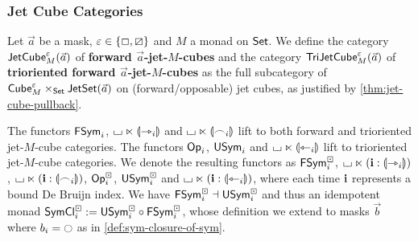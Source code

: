 \documentclass[a4paper]{memoir}
\begin{document}
\subsubsection{Jet Cube Categories}
\begin{definition} \label{def:jet-cube-cat}
	Let $\vec a$ be a mask, $\varepsilon \in \mathopen{}\left\{ \Box, \boxslash \right\}\mathclose{}$ and $M$ a monad on ${\mathsf{Set}}$.
	We define
	the category $\mathsf{JetCube}^{\varepsilon}_{M}\mathopen{}\left( \vec a \right)\mathclose{}$ of \textbf{forward $\vec a$-jet-$M$-cubes} and
	the category $\mathsf{TriJetCube}^{\varepsilon}_{M}\mathopen{}\left( \vec a \right)\mathclose{}$ of \textbf{trioriented forward $\vec a$-jet-$M$-cubes}
	as the full subcategory of ${\mathsf{Cube}}^\varepsilon_M \times_{\mathsf{Set}} \mathsf{JetSet}(\vec a)$ on (forward/opposable) jet cubes, as justified by \cref{thm:jet-cube-pullback}.
\end{definition}
\begin{proposition} \label{thm:lift-to-jet-cubes}
	The functors $\mathsf{FSym}_i$, ${\llcorner\hspace{-.4ex}\lrcorner} \ltimes {\llparenthesis \rightarrowtriangle_i \rrparenthesis}$ and ${\llcorner\hspace{-.4ex}\lrcorner} \ltimes {\llparenthesis \frown_i \rrparenthesis}$ lift to both forward and trioriented jet-$M$-cube categories.
	The functors ${\mathsf{Op}}_i$, $\mathsf{USym}_i$ and ${\llcorner\hspace{-.4ex}\lrcorner} \ltimes {\llparenthesis \leftarrowtriangle_i \rrparenthesis}$ lift to trioriented jet-$M$-cube categories.
	We denote the resulting functors as $\mathsf{FSym}^\boxdot_i$, ${\llcorner\hspace{-.4ex}\lrcorner} \ltimes (\mathbf{i} : {\llparenthesis \rightarrowtriangle_i \rrparenthesis})$, ${\llcorner\hspace{-.4ex}\lrcorner} \ltimes (\mathbf{i} : {\llparenthesis \frown_i \rrparenthesis})$, ${\mathsf{Op}}^\boxdot_i$, $\mathsf{USym}^\boxdot_i$ and ${\llcorner\hspace{-.4ex}\lrcorner} \ltimes (\mathbf{i} : {\llparenthesis \leftarrowtriangle_i \rrparenthesis})$, where each time $\mathbf{i}$ represents a bound De Bruijn index.
	We have $\mathsf{FSym}^\boxdot_i \dashv \mathsf{USym}^\boxdot_i$ and thus an idempotent monad $\mathsf{SymCl}^\boxdot_i := \mathsf{USym}^\boxdot_i \circ \mathsf{FSym}^\boxdot_i$, whose definition we extend to masks $\vec b$ where $b_i = \npolar$ as in \cref{def:sym-closure-of-sym}.
\end{proposition}
\end{document}
